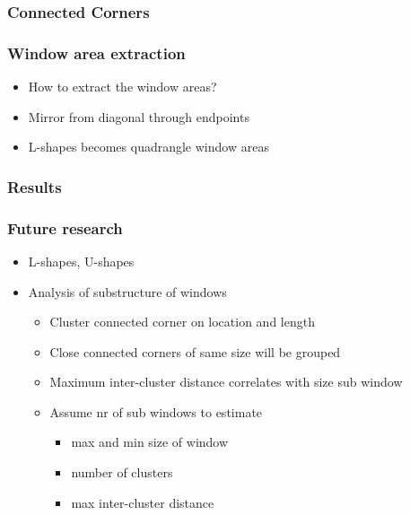 \documentclass{beamer}
\begin{document}
\frame
{
}

\frame
{
	\frametitle{Connected Corners}

}

\frame
{
	\frametitle{Window area extraction}
	\begin{itemize}
	\item <+-| alert@+> How to extract the window areas?
	\item <+-| alert@+> Mirror from diagonal through endpoints
	\item <+-| alert@+> L-shapes becomes quadrangle window areas
	\end{itemize}
}

\frame
{
	\frametitle{Results}
}

\frame
{
	\frametitle{Future research}
	\begin{itemize}
	\item <+-| alert@+> L-shapes, U-shapes
	\item <+-| alert@+> Analysis of substructure of windows
	\begin{itemize}
		\item <+-| alert@+> Cluster connected corner on location and length
		\item <+-| alert@+> Close connected corners of same size will be grouped
		\item <+-| alert@+> Maximum inter-cluster distance correlates with size sub window
		\item <+-| alert@+> Assume nr of sub windows to estimate 
		\begin{itemize}
			\item max and min size of window
			\item number of clusters
			\item max inter-cluster distance
		\end{itemize}
	\end{itemize}
	\end{itemize}
}
\end{document}
